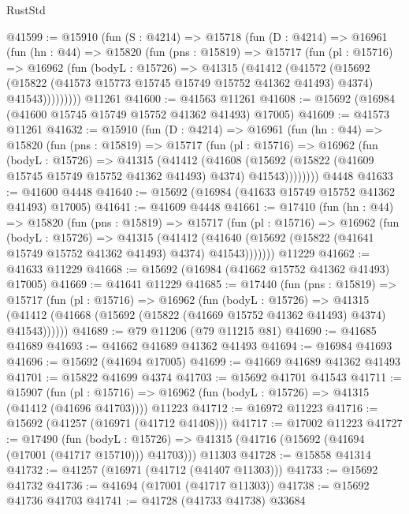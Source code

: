 \begin{lexlean}{RustStd}
\begin{coremodule}
@41599 := @15910
    (fun (S : @4214) =>
    @15718
      (fun (D : @4214) =>
      @16961
        (fun (hn : @44) =>
        @15820
          (fun (pns : @15819) =>
          @15717
            (fun (pl : @15716) =>
            @16962
              (fun (bodyL : @15726) =>
              @41315
                (@41412
                  (@41572
                    (@15692
                      (@15822 (@41573 @15773 @15745 @15749 @15752 @41362 @41493) @4374)
                      @41543)))))))))
    @11261
@41600 := @41563 @11261
@41608 := @15692 (@16984 (@41600 @15745 @15749 @15752 @41362 @41493) @17005)
@41609 := @41573 @11261
@41632 := @15910
    (fun (D : @4214) =>
    @16961
      (fun (hn : @44) =>
      @15820
        (fun (pns : @15819) =>
        @15717
          (fun (pl : @15716) =>
          @16962
            (fun (bodyL : @15726) =>
            @41315
              (@41412
                (@41608
                  (@15692 (@15822 (@41609 @15745 @15749 @15752 @41362 @41493) @4374) @41543))))))))
    @4448
@41633 := @41600 @4448
@41640 := @15692 (@16984 (@41633 @15749 @15752 @41362 @41493) @17005)
@41641 := @41609 @4448
@41661 := @17410
    (fun (hn : @44) =>
    @15820
      (fun (pns : @15819) =>
      @15717
        (fun (pl : @15716) =>
        @16962
          (fun (bodyL : @15726) =>
          @41315
            (@41412
              (@41640 (@15692 (@15822 (@41641 @15749 @15752 @41362 @41493) @4374) @41543)))))))
    @11229
@41662 := @41633 @11229
@41668 := @15692 (@16984 (@41662 @15752 @41362 @41493) @17005)
@41669 := @41641 @11229
@41685 := @17440
    (fun (pns : @15819) =>
    @15717
      (fun (pl : @15716) =>
      @16962
        (fun (bodyL : @15726) =>
        @41315 (@41412 (@41668 (@15692 (@15822 (@41669 @15752 @41362 @41493) @4374) @41543))))))
@41689 := @79 @11206 (@79 @11215 @81)
@41690 := @41685 @41689
@41693 := @41662 @41689 @41362 @41493
@41694 := @16984 @41693
@41696 := @15692 (@41694 @17005)
@41699 := @41669 @41689 @41362 @41493
@41701 := @15822 @41699 @4374
@41703 := @15692 @41701 @41543
@41711 := @15907
    (fun (pl : @15716) => @16962 (fun (bodyL : @15726) => @41315 (@41412 (@41696 @41703))))
    @11223
@41712 := @16972 @11223
@41716 := @15692 (@41257 (@16971 (@41712 @41408)))
@41717 := @17002 @11223
@41727 := @17490
    (fun (bodyL : @15726) => @41315 (@41716 (@15692 (@41694 (@17001 (@41717 @15710))) @41703)))
    @11303
@41728 := @15858 @41314
@41732 := @41257 (@16971 (@41712 (@41407 @11303)))
@41733 := @15692 @41732
@41736 := @41694 (@17001 (@41717 @11303))
@41738 := @15692 @41736 @41703
@41741 := @41728 (@41733 @41738) @33684

\end{coremodule}
\end{lexlean}
